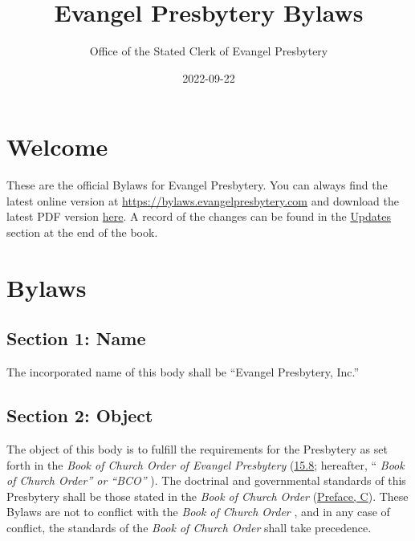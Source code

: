 \documentclass[
]{book}
\title{Evangel Presbytery Bylaws}
\author{Office of the Stated Clerk of Evangel Presbytery}
\date{2022-09-22}
\begin{document}
\maketitle

{
\hypersetup{linkcolor=}
\setcounter{tocdepth}{1}
\tableofcontents
}
\hypertarget{welcome}{%
\chapter*{Welcome}\label{welcome}}

These are the official Bylaws for Evangel Presbytery. You can always find the latest online version at \url{https://bylaws.evangelpresbytery.com} and download the latest PDF version \href{https://bylaws.evangelpresbytery.com/evangel-presbytery-bylaws.pdf}{here}. A record of the changes can be found in the \href{https://bylaws.evangelpresbytery.com/updates.html}{Updates} section at the end of the book.

\mainmatter

\hypertarget{bylaws}{%
\chapter*{Bylaws}\label{bylaws}}

\hypertarget{section-1-name}{%
\section*{Section 1: Name}\label{section-1-name}}

The incorporated name of this body shall be ``Evangel Presbytery, Inc.''

\hypertarget{section-2-object}{%
\section*{Section 2: Object}\label{section-2-object}}

The object of this body is to fulfill the requirements for the Presbytery as set forth in the \emph{Book of Church Order of Evangel Presbytery} (\href{https://bco.evangelpresbytery.com/form-of-government.html\#the-presbytery}{15.8}; hereafter, `` \emph{Book of Church Order'' or ``BCO''} ). The doctrinal and governmental standards of this Presbytery shall be those stated in the \emph{Book of Church Order} (\href{https://bco.evangelpresbytery.com/preface.html}{Preface, C}). These Bylaws are not to conflict with the \emph{Book of Church Order} , and in any case of conflict, the standards of the \emph{Book of Church Order} shall take precedence.
\end{document}
